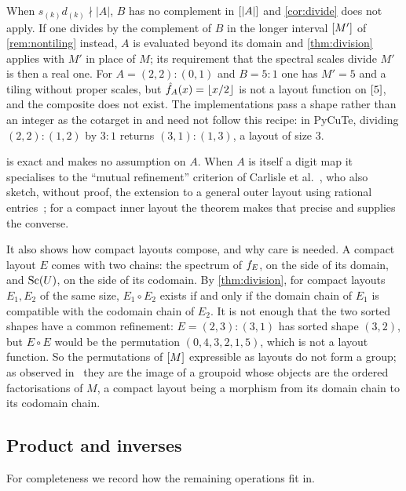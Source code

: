 \begin{remark}\label{rem:roundup}
When $s_{(k)}d_{(k)}\nmid|A|$, $B$ has no complement in $[|A|]$ and \cref{cor:divide} does not
apply. If one divides by the complement of $B$ in the longer interval $[M']$ of
\cref{rem:nontiling} instead, $A$ is evaluated beyond its domain and \cref{thm:division} applies
with $M'$ in place of $M$; its requirement that the spectral scales divide $M'$ is then a real
one. For $A=(2,2):(0,1)$ and $B=5:1$ one has $M'=5$ and a tiling without proper scales, but
$\hat{f}_{A}(x)=\left\lfloor x/2 \right\rfloor$ is not a layout function on $[5]$, and the composite does not exist.
The implementations pass a shape rather than an integer as the cotarget in 
and need not follow this recipe: in PyCuTe, dividing $(2,2):(1,2)$ by $3:1$ returns
$(3,1):(1,3)$, a layout of size $3$.
\end{remark}

 is exact and makes no assumption on $A$. When $A$ is itself a digit map it
specialises to the ``mutual refinement'' criterion of Carlisle et al.~\cite[\S4.1]{carlisle2026},
who also sketch, without proof, the extension to a general outer layout using rational
entries~\cite[\S4.1.5]{carlisle2026}; for a compact inner layout the theorem makes that precise
and supplies the converse.

It also shows how compact layouts compose, and why care is needed. A compact layout $E$ comes
with two chains: the spectrum of $f_{E}$, on the side of its domain, and $\operatorname{Sc}(U)$, on the side
of its codomain. By \cref{thm:division}, for compact layouts $E_1,E_2$ of the same size,
$E_1\circ E_2$ exists if and only if the domain chain of $E_1$ is compatible with the codomain
chain of $E_2$. It is not enough that the two sorted shapes
have a common refinement: $E=(2,3):(3,1)$ has sorted shape $(3,2)$, but $E\circ E$ would be the
permutation $(0,4,3,2,1,5)$, which is not a layout function. So the permutations of $[M]$
expressible as layouts do not form a group; as observed in~\cite[\S3]{shah2024} they are the image
of a groupoid whose objects are the ordered factorisations of $M$, a compact layout being a
morphism from its domain chain to its codomain chain.

\subsection{Product and inverses}

For completeness we record how the remaining operations fit in.

